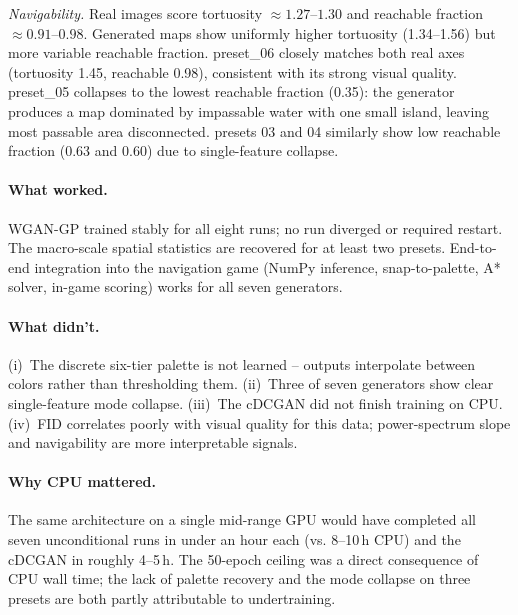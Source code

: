 \documentclass[11pt]{article}
\begin{document}
\textit{Navigability.} Real images score tortuosity $\approx 1.27$--$1.30$
and reachable fraction $\approx 0.91$--$0.98$. Generated maps show uniformly
higher tortuosity (1.34--1.56) but more variable reachable fraction.
preset\_06 closely matches both real axes (tortuosity 1.45, reachable 0.98),
consistent with its strong visual quality. preset\_05 collapses to the lowest
reachable fraction (0.35): the generator produces a map dominated by
impassable water with one small island, leaving most passable area
disconnected. presets 03 and 04 similarly show low reachable fraction (0.63
and 0.60) due to single-feature collapse.

\paragraph{What worked.}
WGAN-GP trained stably for all eight runs; no run diverged or required
restart. The macro-scale spatial statistics are recovered for at least two
presets. End-to-end integration into the navigation game (NumPy inference,
snap-to-palette, A* solver, in-game scoring) works for all seven
generators.

\paragraph{What didn't.}
(i)~The discrete six-tier palette is not learned -- outputs interpolate
between colors rather than thresholding them.
(ii)~Three of seven generators show clear single-feature mode collapse.
(iii)~The cDCGAN did not finish training on CPU.
(iv)~FID correlates poorly with visual quality for this data; power-spectrum
slope and navigability are more interpretable signals.

\paragraph{Why CPU mattered.}
The same architecture on a single mid-range GPU would have completed all
seven unconditional runs in under an hour each (vs. 8--10\,h CPU) and the
cDCGAN in roughly 4--5\,h. The 50-epoch ceiling was a direct consequence of
CPU wall time; the lack of palette recovery and the mode collapse on three
presets are both partly attributable to undertraining.

\end{document}
